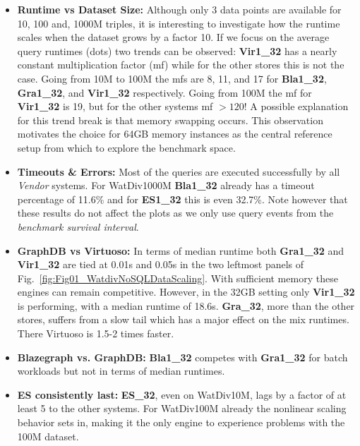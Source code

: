 \begin{itemize}
	\item \textbf{Runtime vs Dataset Size:} Although only 3 data points are available for 10, 100 and, 1000M triples, it is interesting to investigate how the runtime scales when the dataset grows by a factor 10. If we focus on the average query runtimes (dots) two trends can be observed: \textbf{Vir1\_32} has a nearly constant multiplication factor (mf) while for the other stores this is not the case. Going from 10M to 100M the mfs are 8, 11, and 17 for \textbf{Bla1\_32}, \textbf{Gra1\_32}, and \textbf{Vir1\_32} respectively. Going from 100M the mf for \textbf{Vir1\_32} is 19, but for the other systems mf $> 120$! A possible explanation for this trend break is that memory swapping occurs. This observation motivates the choice for 64GB memory instances as the central reference setup from which to explore the benchmark space.
\item \textbf{Timeouts \& Errors:} Most of the queries are executed successfully by all \emph{Vendor} systems. For WatDiv1000M \textbf{Bla1\_32} already has a timeout percentage of 11.6\% and for \textbf{ES1\_32} this is even 32.7\%. Note however that these results do not affect the plots as we only use query events from the \emph{benchmark survival interval}. 
\item \textbf{GraphDB vs Virtuoso:} In terms of median runtime both \textbf{Gra1\_32} and \textbf{Vir1\_32} are tied at 0.01s and 0.05s in the two leftmost panels of Fig.~\ref{fig:Fig01_WatdivNoSQLDataScaling}. With sufficient memory these engines can remain competitive. However, in the 32GB setting only \textbf{Vir1\_32} is performing, with a median runtime of 18.6s. \textbf{Gra\_32}, more than the other stores, suffers from a slow tail which has a major effect on the mix runtimes. There Virtuoso is 1.5-2 times faster.

\item \textbf{Blazegraph vs. GraphDB:} \textbf{Bla1\_32} competes with \textbf{Gra1\_32} for batch workloads but not in terms of median runtimes.

\item \textbf{ES consistently last:} \textbf{ES\_32}, even on WatDiv10M, lags by a factor of at least 5 to the other systems. For WatDiv100M already the nonlinear scaling behavior sets in, making it the only engine to experience problems with the 100M dataset. 
\end{itemize}
%

